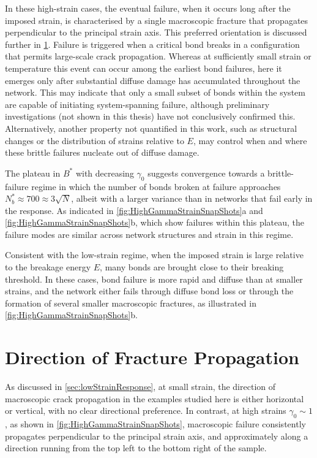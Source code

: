 \documentclass[asymmetricmargins]{library/duthesis}%
\begin{document}
In these high-strain cases, the eventual failure, when it occurs long after the imposed strain, is characterised by a single macroscopic fracture that propagates perpendicular to the principal strain axis. This preferred orientation is discussed further in \cref{sec:DirectionOfFracture}. Failure is triggered when a critical bond breaks in a configuration that permits large-scale crack propagation. Whereas at sufficiently small strain or temperature this event can occur among the earliest bond failures, here it emerges only after substantial diffuse damage has accumulated throughout the network. This may indicate that only a small subset of bonds within the system are capable of initiating system-spanning failure, although preliminary investigations (not shown in this thesis) have not conclusively confirmed this. Alternatively, another property not quantified in this work, such as structural changes or the distribution of strains relative to $E$, may control when and where these brittle failures nucleate out of diffuse damage.

The plateau in $B^*$ with decreasing $\gamma_0$ suggests convergence towards a brittle-failure regime in which the number of bonds broken at failure approaches $N_b^*\approx 700 \approx 3 \sqrt{N}$, albeit with a larger variance than in networks that fail early in the response. As indicated in \cref{fig:HighGammaStrainSnapShots}a and \cref{fig:HighGammaStrainSnapShots}b, which show failures within this plateau, the failure modes are similar across network structures and strain in this regime. 

Consistent with the low-strain regime, when the imposed strain is large relative to the breakage energy $E$, many bonds are brought close to their breaking threshold. In these cases, bond failure is more rapid and diffuse than at smaller strains, and the network either fails through diffuse bond loss or through the formation of several smaller macroscopic fractures, as illustrated in \cref{fig:HighGammaStrainSnapShots}b.

\section{Direction of Fracture Propagation} \label{sec:DirectionOfFracture}

As discussed in \cref{sec:lowStrainResponse}, at small strain, the direction of macroscopic crack propagation in the examples studied here is either horizontal or vertical, with no clear directional preference. In contrast, at high strains $\gamma_0\sim 1$, as shown in \cref{fig:HighGammaStrainSnapShots}, macroscopic failure consistently propagates perpendicular to the principal strain axis, and approximately along a direction running from the top left to the bottom right of the sample.
\end{document}
